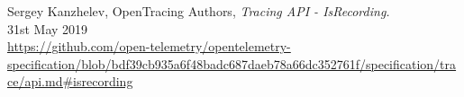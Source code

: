 \documentclass[12pt,pdftex,titlepage]{report}
\begin{document}
\begin{thebibliography}{69}
        Sergey Kanzhelev, OpenTracing Authors, \textit{Tracing API - IsRecording.} \\
        31st May 2019 \\
        \url{https://github.com/open-telemetry/opentelemetry-specification/blob/bdf39cb935a6f48badc687daeb78a66dc352761f/specification/trace/api.md#isrecording}

    \end{thebibliography}
\end{document}

